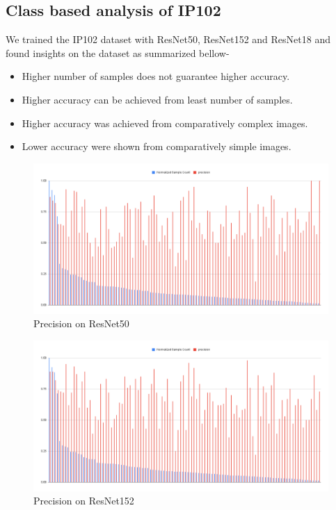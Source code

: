 \subsection{Class based analysis of IP102}
We trained the IP102 dataset with ResNet50, ResNet152 and ResNet18 and found insights on the dataset as summarized bellow-
\begin{itemize}
    \item Higher number of samples does not guarantee higher accuracy.
    \item Higher accuracy can be achieved from least number of samples. 
    \item Higher accuracy was achieved from comparatively complex images.
    \item Lower accuracy were shown from comparatively simple images.
\end{itemize}
\begin{figure}
    \centering
    \includegraphics[scale=.5]{figures/chart.png}
    \caption{Precision on ResNet50}
    \label{fig:rn50}
\end{figure}
\begin{figure}
    \centering
    \includegraphics[scale=.5]{figures/chart (1).png}
    \caption{Precision on ResNet152}
    \label{fig:rn152}
\end{figure}
